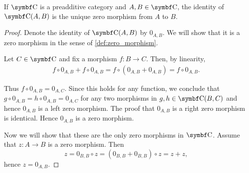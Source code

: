 \begin{proposition}\label{def:preadditive_zero_morphisms}
  If \( \Bold C \) is a preadditive category and \( A, B \in \Cat{C} \), the identity of \( \Bold{C}(A, B) \) is the unique zero morphism from \( A \) to \( B \).
\end{proposition}
\begin{proof}
  Denote the identity of \( \Cat{C}(A, B) \) by \( 0_{A,B} \). We will show that it is a zero morphism in the sense of \cref{def:zero_morphism}.

  Let \( C \in \Cat{C} \) and fix a morphism \( f: B \to C \). Then, by linearity,
  \begin{align*}
    f \circ 0_{A,B} + f \circ 0_{A,B}
    =
    f \circ (0_{A,B} + 0_{A,B})
    =
    f \circ 0_{A,B}.
  \end{align*}

  Thus \( f \circ 0_{A,B} = 0_{A,C} \). Since this holds for any function, we conclude that \( g \circ 0_{A,B} = h \circ 0_{A,B} = 0_{A,C} \) for any two morphisms in \( g, h \in \Cat{C}(B,C) \) and hence \( 0_{A,B} \) is a left zero morphism. The proof that \( 0_{A,B} \) is a right zero morphism is identical. Hence \( 0_{A,B} \) is a zero morphism.

  Now we will show that these are the only zero morphisms in \( \Cat{C} \). Assume that \( z: A \to B \) is a zero morphism. Then
  \begin{equation*}
    z = 0_{B,B} \circ z = (0_{B,B} + 0_{B,B}) \circ z = z + z,
  \end{equation*}
  hence \( z = 0_{A,B} \).
\end{proof}

